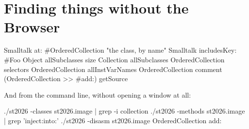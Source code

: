 \section{Finding things without the Browser}
\label{sec:withoutbrowser}

\begin{st}
Smalltalk at: #OrderedCollection      "the class, by name"
Smalltalk includesKey: #Foo
Object allSubclasses size
Collection allSubclasses
OrderedCollection selectors
OrderedCollection allInstVarNames
OrderedCollection comment
(OrderedCollection >> #add:) getSource
\end{st}

And from the command line, without opening a window at all:

\begin{sh}
./st2026 -classes st2026.image | grep -i collection
./st2026 -methods st2026.image | grep 'inject:into:'
./st2026 -disasm st2026.image OrderedCollection add:
\end{sh}
